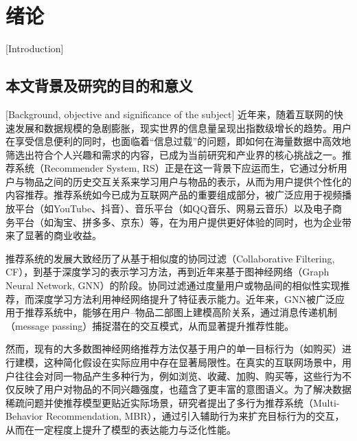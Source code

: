 
\chapter{绪论}[Introduction]

\section{本文背景及研究的目的和意义}[Background, objective and significance of the subject]
近年来，随着互联网的快速发展和数据规模的急剧膨胀，现实世界的信息量呈现出指数级增长的趋势。用户在享受信息便利的同时，也面临着“信息过载”的问题，即如何在海量数据中高效地筛选出符合个人兴趣和需求的内容，已成为当前研究和产业界的核心挑战之一。推荐系统（Recommender System, RS）正是在这一背景下应运而生，它通过分析用户与物品之间的历史交互关系来学习用户与物品的表示，从而为用户提供个性化的内容推荐\cite{中文推荐算法综述2009, gao2022graph-survey,zhou2023comprehensive}。推荐系统如今已成为互联网产品的重要组成部分，被广泛应用于视频播放平台（如YouTube、抖音）、音乐平台（如QQ音乐、网易云音乐）以及电子商务平台（如淘宝、拼多多、京东）等，在为用户提供更好体验的同时，也为企业带来了显著的商业收益。

推荐系统的发展大致经历了从基于相似度的协同过滤（Collaborative Filtering, CF）\cite{collaboratives2025survey}，到基于深度学习的表示学习方法\cite{zhou2023comprehensive}，再到近年来基于图神经网络（Graph Neural Network, GNN）\cite{gao2022graph-survey}的阶段。协同过滤通过度量用户或物品间的相似性实现推荐，而深度学习方法利用神经网络提升了特征表示能力。近年来，GNN被广泛应用于推荐系统中，能够在用户–物品二部图上建模高阶关系，通过消息传递机制（message passing）捕捉潜在的交互模式，从而显著提升推荐性能。

然而，现有的大多数图神经网络推荐方法仅基于用户的单一目标行为（如购买）进行建模\cite{he2020lightgcn, fan2023graphDA, wang2019NGCF}，这种简化假设在实际应用中存在显著局限性。在真实的互联网场景中，用户往往会对同一物品产生多种行为\cite{chen2021GHCF, gu2022S-MBRec}，例如浏览、收藏、加购、购买等，这些行为不仅反映了用户对物品的不同兴趣强度，也蕴含了更丰富的意图语义。为了解决数据稀疏问题并使推荐模型更贴近实际场景，研究者提出了多行为推荐系统（Multi-Behavior Recommendation, MBR），通过引入辅助行为来扩充目标行为的交互，从而在一定程度上提升了模型的表达能力与泛化性能。


